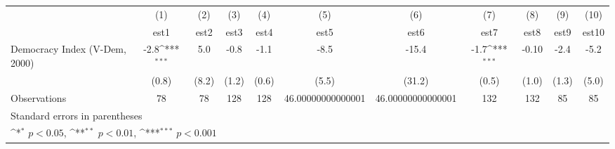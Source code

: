 {
\def\sym#1{\ifmmode^{#1}\else\(^{#1}\)\fi}
\begin{tabular}{l*{10}{c}}
\hline\hline
                    &\multicolumn{1}{c}{(1)}         &\multicolumn{1}{c}{(2)}         &\multicolumn{1}{c}{(3)}         &\multicolumn{1}{c}{(4)}         &\multicolumn{1}{c}{(5)}         &\multicolumn{1}{c}{(6)}         &\multicolumn{1}{c}{(7)}         &\multicolumn{1}{c}{(8)}         &\multicolumn{1}{c}{(9)}         &\multicolumn{1}{c}{(10)}         \\
                    &        est1         &        est2         &        est3         &        est4         &        est5         &        est6         &        est7         &        est8         &        est9         &       est10         \\
\hline
Democracy Index (V-Dem, 2000)&        -2.8\sym{***}&         5.0         &        -0.8         &        -1.1         &        -8.5         &       -15.4         &        -1.7\sym{***}&       -0.10         &        -2.4         &        -5.2         \\
                    &       (0.8)         &       (8.2)         &       (1.2)         &       (0.6)         &       (5.5)         &      (31.2)         &       (0.5)         &       (1.0)         &       (1.3)         &       (5.0)         \\
\hline
Observations        &          78         &          78         &         128         &         128         &46.00000000000001         &46.00000000000001         &         132         &         132         &          85         &          85         \\
\hline\hline
\multicolumn{11}{l}{\footnotesize Standard errors in parentheses}\\
\multicolumn{11}{l}{\footnotesize \sym{*} \(p<0.05\), \sym{**} \(p<0.01\), \sym{***} \(p<0.001\)}\\
\end{tabular}
}
